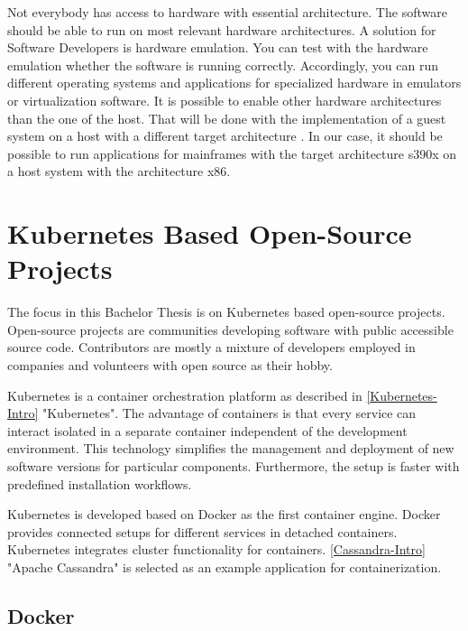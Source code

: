 Not everybody has access to hardware with essential architecture. The software should be able to run on most relevant hardware architectures. A solution for Software Developers is hardware emulation. 
You can test with the hardware emulation whether the software is running correctly. 
Accordingly, you can run different operating systems and applications for specialized hardware in emulators or virtualization software. 
It is possible to enable other hardware architectures than the one of the host. 
That will be done with the implementation of a guest system on a host with a different target architecture \cite[~p.3]{Rosenthal2015}. In our case, it should be possible to run applications for mainframes with the target
architecture s390x on a host system with the architecture x86.


\section{Kubernetes Based Open-Source Projects}

The focus in this Bachelor Thesis is on Kubernetes based open-source projects. Open-source projects are communities developing software with public accessible source code. Contributors are mostly a mixture of developers employed in companies and volunteers with open source as their hobby.

Kubernetes is a container orchestration platform as described in \ref{Kubernetes-Intro} "Kubernetes".
The advantage of containers is that every service can interact isolated in a separate container independent of the development environment. This technology simplifies the management and deployment of new software versions for particular components.
Furthermore, the setup is faster with predefined installation workflows.

Kubernetes is developed based on Docker as the first container engine. Docker provides connected setups for different services in detached containers. Kubernetes integrates cluster functionality for containers.
\ref{Cassandra-Intro} "Apache Cassandra" is selected as an example application for containerization.

\subsection{Docker}\label{Docker-Intro}

